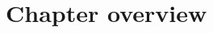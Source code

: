 \section{Chapter overview}

\begin{description}[\setleftmargin{70pt}\setlabelstyle{\bf}]

\item [Chapter 2]

\item [Chapter 3]

\item [Chapter 4]

\item [Chapter 5]

\end{description}
